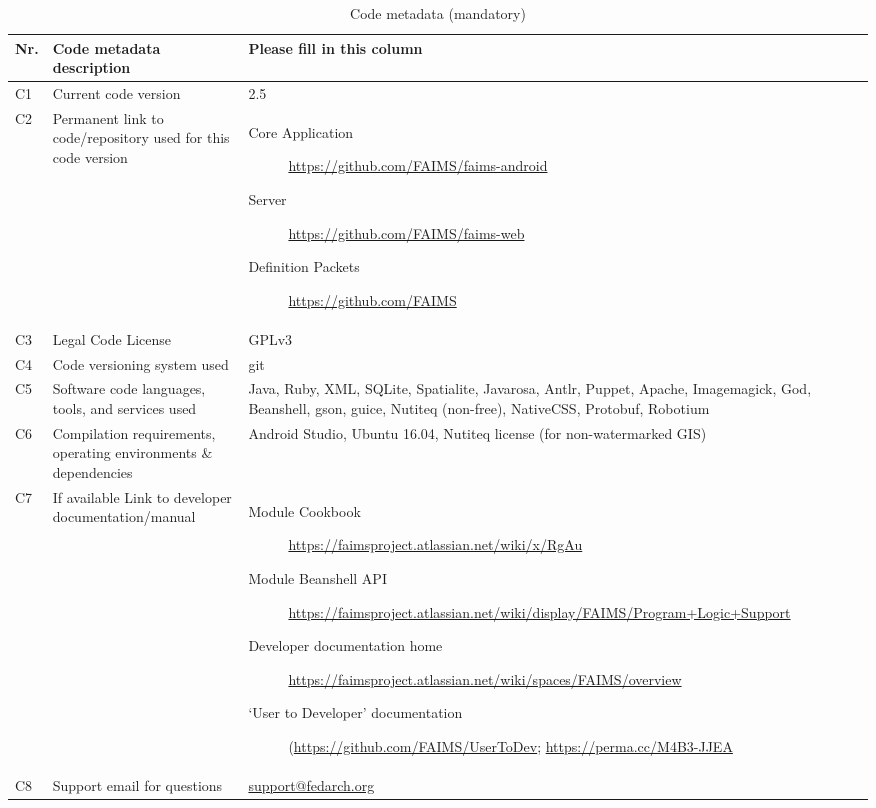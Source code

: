 \documentclass[preprint,12pt, a4paper]{elsarticle}
\begin{document}
\begin{table}[!h]
\begin{tabular}{|l|p{6.5cm}|p{6.5cm}|}
\hline
\textbf{Nr.} & \textbf{Code metadata description} & \textbf{Please fill in this column} \\
\hline
C1 & Current code version & 2.5 \\
\hline
C2 & Permanent link to code/repository used for this code version & \begin{description}\item [Core Application] \url{https://github.com/FAIMS/faims-android}
\item [Server] \url{https://github.com/FAIMS/faims-web}
\item [Definition Packets] \url{https://github.com/FAIMS}  
\end{description}
\\
\hline
C3 & Legal Code License & GPLv3 \\
\hline
C4 & Code versioning system used & git \\
\hline
C5 & Software code languages, tools, and services used & Java, Ruby, XML, SQLite, Spatialite, Javarosa, Antlr, Puppet, Apache, Imagemagick, God, Beanshell, gson, guice, Nutiteq (non-free), NativeCSS, Protobuf, Robotium \\
\hline
C6 & Compilation requirements, operating environments \& dependencies & Android Studio, Ubuntu 16.04, Nutiteq license (for non-watermarked GIS)\\
\hline
C7 & If available Link to developer documentation/manual & \begin{description} \item [Module Cookbook] \url{https://faimsproject.atlassian.net/wiki/x/RgAu} 
\item [Module Beanshell API] \url{https://faimsproject.atlassian.net/wiki/display/FAIMS/Program+Logic+Support}
\item [Developer documentation home] \url{https://faimsproject.atlassian.net/wiki/spaces/FAIMS/overview}
\item [`User to Developer' documentation] (\url{https://github.com/FAIMS/UserToDev}; \url{https://perma.cc/M4B3-JJEA}
\end{description}
 \\
\hline
C8 & Support email for questions & \url{support@fedarch.org} \\
\hline
\end{tabular}
\caption{Code metadata (mandatory)}

\end{table}
\end{document}
